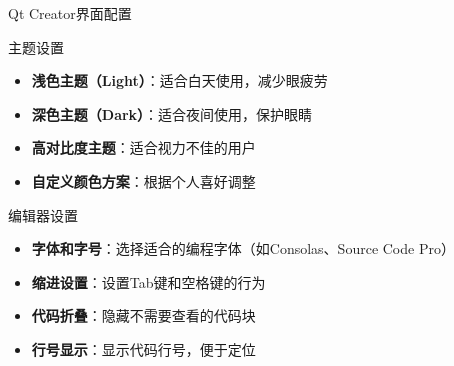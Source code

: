 \documentclass[UTF8,aspectratio=169]{beamer}
\begin{document}
\begin{frame}{Qt Creator界面配置}
    \begin{ytublock}{主题设置}
        \begin{itemize}
            \item \textbf{浅色主题（Light）}：适合白天使用，减少眼疲劳
            \item \textbf{深色主题（Dark）}：适合夜间使用，保护眼睛
            \item \textbf{高对比度主题}：适合视力不佳的用户
            \item \textbf{自定义颜色方案}：根据个人喜好调整
        \end{itemize}
    \end{ytublock}

    \begin{ytublock}{编辑器设置}
        \begin{itemize}
            \item \textbf{字体和字号}：选择适合的编程字体（如Consolas、Source Code Pro）
            \item \textbf{缩进设置}：设置Tab键和空格键的行为
            \item \textbf{代码折叠}：隐藏不需要查看的代码块
            \item \textbf{行号显示}：显示代码行号，便于定位
        \end{itemize}
    \end{ytublock}
\end{frame}
\end{document}
